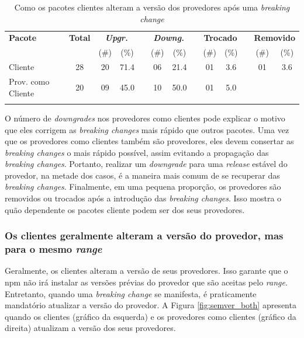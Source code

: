 \begin{table}
	\centering
	\caption{Como os pacotes clientes alteram a versão dos provedores após uma \textit{breaking change}}
	\begin{tabular}{lcccccccccccc} \toprule
		\textbf{Pacote} & \textbf{Total} & \multicolumn{2}{c}{\textbf{\textit{Upgr.}}} & \phantom{ab} & \multicolumn{2}{c}{\textbf{\textit{Downg.}}} & \phantom{ab} & \multicolumn{2}{c}{\textbf{Trocado}} & \phantom{ab} & \multicolumn{2}{c}{\textbf{Removido}}
		\\ \cmidrule{3-4} \cmidrule{6-7} \cmidrule{9-10} \cmidrule{12-13}
		           &    & (\#) & (\%) && (\#) & (\%) && (\#) & (\%) && (\#) & (\%) \\ \midrule
		Cliente     & 28 & 20   & 71.4 && 06   & 21.4 && 01   & 3.6  &&  01  & 3.6  \\
		Prov. como Cliente & 20 & 09   & 45.0 && 10   & 50.0 && 01   & 5.0  && \textemdash & \textemdash \\ \bottomrule
		\label{tab:version_change}
	\end{tabular}
\end{table}

O número de \textit{downgrades} nos provedores como clientes pode explicar o motivo que eles corrigem as \textit{breaking changes} mais rápido que outros pacotes. Uma vez que os provedores como clientes também são provedores, eles devem consertar as \textit{breaking changes} o mais rápido possível, assim evitando a propagação das \textit{breaking changes}. Portanto, realizar um \textit{downgrade} para uma \textit{release} estável do provedor, na metade dos casos, é a maneira mais comum de se recuperar das \textit{breaking changes}. Finalmente, em uma pequena proporção, os provedores são removidos ou trocados após a introdução das \textit{breaking changes}. Isso mostra o quão dependente os pacotes cliente podem ser dos seus provedores.

\subsubsection{Os clientes geralmente alteram a versão do provedor, mas para o mesmo \textit{range}}

Geralmente, os clientes alteram a versão de seus provedores. Isso garante que o \textsf{npm} não irá instalar as versões prévias do provedor que são aceitas pelo \textit{range}. Entretanto, quando uma \textit{breaking change} se manifesta, é praticamente mandatório atualizar a versão do provedor. A Figura \ref{fig:semver_both} apresenta quando os clientes (gráfico da esquerda) e os provedores como clientes (gráfico da direita) atualizam a versão dos seus provedores.

